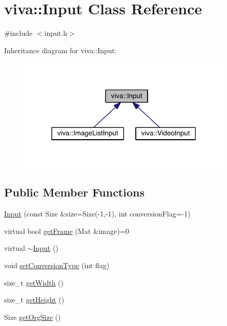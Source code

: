 \hypertarget{classviva_1_1_input}{}\section{viva\+:\+:Input Class Reference}
\label{classviva_1_1_input}


{\ttfamily \#include $<$input.\+h$>$}



Inheritance diagram for viva\+:\+:Input\+:
\nopagebreak
\begin{figure}[H]
\begin{center}
\leavevmode
\includegraphics[width=290pt]{classviva_1_1_input__inherit__graph}
\end{center}
\end{figure}
\subsection*{Public Member Functions}
\begin{DoxyCompactItemize}
\item 
\hyperlink{classviva_1_1_input_a4c00744cd1dca9bb025a8b8bc4c9541d}{Input} (const Size \&size=Size(-\/1,-\/1), int conversion\+Flag=-\/1)
\item 
virtual bool \hyperlink{classviva_1_1_input_aa24f1c290895fba92d7e1c6032dc4ecb}{get\+Frame} (Mat \&image)=0
\item 
virtual \hyperlink{classviva_1_1_input_a278d491b01b3e2b76683b8949549250b}{$\sim$\+Input} ()
\item 
void \hyperlink{classviva_1_1_input_a9b0fbd57dd4c1c68428174530c588694}{set\+Conversion\+Type} (int flag)
\item 
size\+\_\+t \hyperlink{classviva_1_1_input_a510a003dcbd21eef8a10912d648293c7}{get\+Width} ()
\item 
size\+\_\+t \hyperlink{classviva_1_1_input_adebf24bbf1bd6306fcd7f0ff38149a43}{get\+Height} ()
\item 
Size \hyperlink{classviva_1_1_input_a0c7faa4c9daf1e46caf7d80994ea4ef5}{get\+Org\+Size} ()
\end{DoxyCompactItemize}
